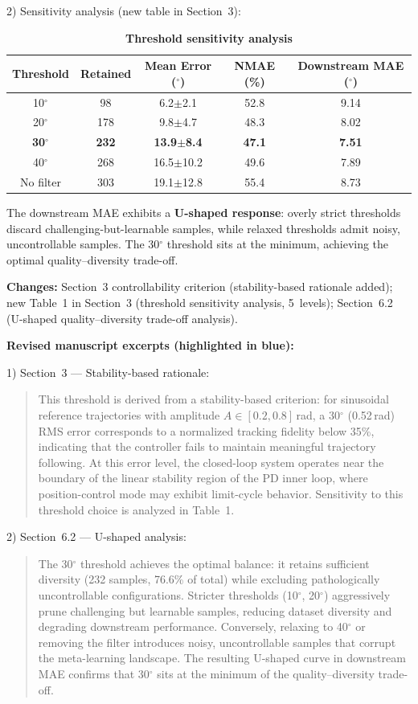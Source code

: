 \documentclass[11pt,a4paper]{article}
\begin{document}
2) Sensitivity analysis (new table in Section~3):

\begin{table}[h]
\centering\small
\caption*{\textbf{Threshold sensitivity analysis}}
\begin{tabular}{ccccc}
\toprule
Threshold & Retained & Mean Error ($^\circ$) & NMAE (\%) & Downstream MAE ($^\circ$) \\
\midrule
10$^\circ$ & 98  & 6.2$\pm$2.1  & 52.8 & 9.14 \\
20$^\circ$ & 178 & 9.8$\pm$4.7  & 48.3 & 8.02 \\
\textbf{30$^\circ$} & \textbf{232} & \textbf{13.9$\pm$8.4} & \textbf{47.1} & \textbf{7.51} \\
40$^\circ$ & 268 & 16.5$\pm$10.2 & 49.6 & 7.89 \\
No filter  & 303 & 19.1$\pm$12.8 & 55.4 & 8.73 \\
\bottomrule
\end{tabular}
\end{table}

The downstream MAE exhibits a \textbf{U-shaped response}: overly strict thresholds discard challenging-but-learnable samples, while relaxed thresholds admit noisy, uncontrollable samples. The 30$^\circ$ threshold sits at the minimum, achieving the optimal quality--diversity trade-off.

\textbf{Changes:} Section~3 controllability criterion (stability-based rationale added); new Table~1 in Section~3 (threshold sensitivity analysis, 5~levels); Section~6.2 (U-shaped quality--diversity trade-off analysis).

\textbf{Revised manuscript excerpts (highlighted in blue):}

1) Section~3 --- Stability-based rationale:
\begin{quote}\color{blue}\small
This threshold is derived from a stability-based criterion: for sinusoidal reference trajectories with amplitude $A \in [0.2, 0.8]$\,rad, a 30$^\circ$ (0.52\,rad) RMS error corresponds to a normalized tracking fidelity below 35\%, indicating that the controller fails to maintain meaningful trajectory following. At this error level, the closed-loop system operates near the boundary of the linear stability region of the PD inner loop, where position-control mode may exhibit limit-cycle behavior. Sensitivity to this threshold choice is analyzed in Table~1.
\end{quote}

2) Section~6.2 --- U-shaped analysis:
\begin{quote}\color{blue}\small
The 30$^\circ$ threshold achieves the optimal balance: it retains sufficient diversity (232 samples, 76.6\% of total) while excluding pathologically uncontrollable configurations. Stricter thresholds (10$^\circ$, 20$^\circ$) aggressively prune challenging but learnable samples, reducing dataset diversity and degrading downstream performance. Conversely, relaxing to 40$^\circ$ or removing the filter introduces noisy, uncontrollable samples that corrupt the meta-learning landscape. The resulting U-shaped curve in downstream MAE confirms that 30$^\circ$ sits at the minimum of the quality--diversity trade-off.
\end{quote}
\end{document}
